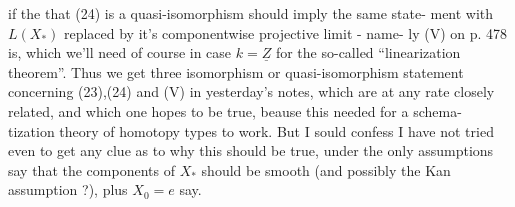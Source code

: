 
if the  that (24) is a quasi-isomorphism should imply the same state-%
ment with $L(X_*)$ replaced by it's componentwise projective limit - name-%
ly  (V) on p. 478 is, which we'll need of course in case $k=\underline{Z}$ for the
so-called ``linearization theorem''.  Thus we get three 
isomorphism or quasi-isomorphism statement concerning (23),(24) and
(V) in yesterday's notes, which are at any rate closely related, and
which  one hopes to be true, beause this  needed for a schema-%
tization theory of homotopy types to work. But I sould confess I have
not tried even to get any clue as to why this should be true, under the
only assumptions say that the components of $X_*$ should be smooth (and
possibly the Kan assumption ?), plus $X_0=e$ say.

